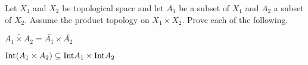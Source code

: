\begin{comment}
The neighborhood $(x-1,x+1) \times \{y\}$ of the point $(x,y)$ does not intersect $C$ if $y \geq 1$ or $y < 0$, so points of this form are not in $C'$. Similarly, the neighborhood $(x-r,x+r) \times \{y\}$ with $r = 0.5\min\{|x|, |1-x|\}$ does not intersect $C$ for any value of $y$ if $x > 1$ or $x < 0$. So points of this form are not in $C'$. Any neighborhood of the point $(0,y)$ for $0 \leq y < 1$ contains a basic open set of the form $(a,b) \times \{y\}$ with $a < 0 < b$, and each of these basic open sets contains a point in $C$. So these points are all limit points of $C$. Along those same lines, any neighborhood of the point $(1,y)$ for $0 \leq y < 1$ contains a basic open set of the form $(a,b) \times \{y\}$ with $a < 1 < b$, and each of these basic open sets contains a point in $C$. So these points are all limit points of $C$. We conclude that $\overline{C} = \{(x,y) \mid 0 \leq x \leq 1, 0  \leq y < 1\}$. 
	
	\end{enumerate}

\ea

\end{comment}

\item \label{ex:product_closure} Let $X_1$ and $X_2$ be topological space and let $A_1$ be a subset of $X_1$ and $A_2$ a subset of $X_2$. Assume the product topology on $X_1 \times X_2$. Prove each of the following.

\ba

\item $\overline{A_1 \times A_2} = \overline{A_1} \times \overline{A_2}$

\item $\text{Int}(A_1 \times A_2) \subseteq \text{Int}{A_1} \times \text{Int}{A_2}$

\ea

